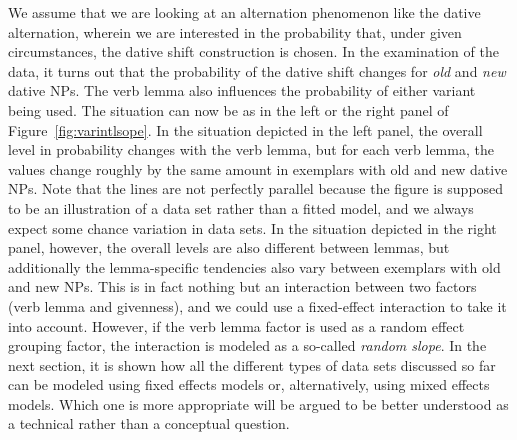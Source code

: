 We assume that we are looking at an alternation phenomenon like the dative alternation, wherein we are interested in the probability that, under given circumstances, the dative shift construction is chosen.
In the examination of the data, it turns out that the probability of the dative shift changes for \textit{old} and \textit{new} dative NPs.
The verb lemma also influences the probability of either variant being used.
The situation can now be as in the left or the right panel of Figure~\ref{fig:varintlsope}.
In the situation depicted in the left panel, the overall level in probability changes with the verb lemma, but for each verb lemma, the values change roughly by the same amount in exemplars with old and new dative NPs.
Note that the lines are not perfectly parallel because the figure is supposed to be an illustration of a data set rather than a fitted model, and we always expect some chance variation in data sets.
In the situation depicted in the right panel, however, the overall levels are also different between lemmas, but additionally the lemma-specific tendencies also vary between exemplars with old and new NPs.
This is in fact nothing but an interaction between two factors (verb lemma and givenness), and we could use a fixed-effect interaction to take it into account.
However, if the verb lemma factor is used as a random effect grouping factor, the interaction is modeled as a so-called \textit{random slope}.
In the next section, it is shown how all the different types of data sets discussed so far can be modeled using fixed effects models or, alternatively, using mixed effects models.
Which one is more appropriate will be argued to be better understood as a technical rather than a conceptual question.

